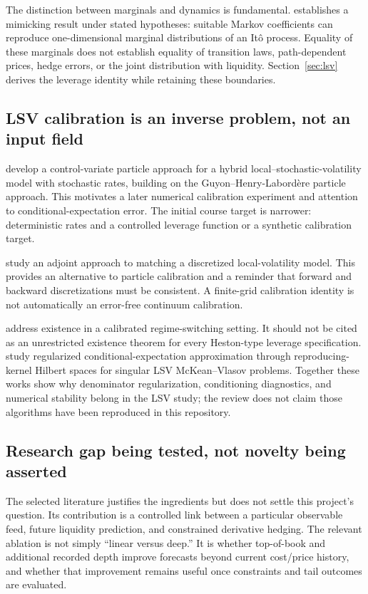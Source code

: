 The distinction between marginals and dynamics is fundamental. \citet{gyongy1986} establishes a mimicking result under stated hypotheses: suitable Markov coefficients can reproduce one-dimensional marginal distributions of an It\^o process. Equality of these marginals does not establish equality of transition laws, path-dependent prices, hedge errors, or the joint distribution with liquidity. Section~\ref{sec:lsv} derives the leverage identity while retaining these boundaries.

\subsection{LSV calibration is an inverse problem, not an input field}
\citet{cozma2019} develop a control-variate particle approach for a hybrid local--stochastic-volatility model with stochastic rates, building on the Guyon--Henry-Labord\`ere particle approach. This motivates a later numerical calibration experiment and attention to conditional-expectation error. The initial course target is narrower: deterministic rates and a controlled leverage function or a synthetic calibration target.

\citet{wyns2016} study an adjoint approach to matching a discretized local-volatility model. This provides an alternative to particle calibration and a reminder that forward and backward discretizations must be consistent. A finite-grid calibration identity is not automatically an error-free continuum calibration.

\citet{jourdain2020} address existence in a calibrated regime-switching setting. It should not be cited as an unrestricted existence theorem for every Heston-type leverage specification. \citet{bayer2024} study regularized conditional-expectation approximation through reproducing-kernel Hilbert spaces for singular LSV McKean--Vlasov problems. Together these works show why denominator regularization, conditioning diagnostics, and numerical stability belong in the LSV study; the review does not claim those algorithms have been reproduced in this repository.

\subsection{Research gap being tested, not novelty being asserted}
The selected literature justifies the ingredients but does not settle this project's question. Its contribution is a controlled link between a particular observable feed, future liquidity prediction, and constrained derivative hedging. The relevant ablation is not simply ``linear versus deep.'' It is whether top-of-book and additional recorded depth improve forecasts beyond current cost/price history, and whether that improvement remains useful once constraints and tail outcomes are evaluated.

